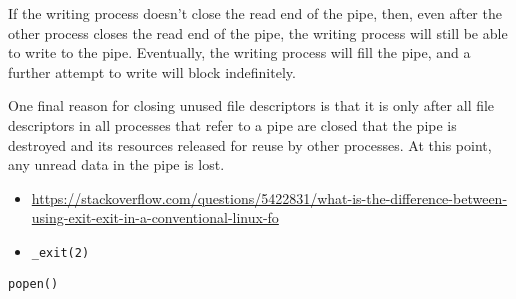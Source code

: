 \begin{itemize}
  If the writing process doesn't close the read end of the pipe, then, even after the
  other process closes the read end of the pipe, the writing process will still be able to
  write to the pipe. Eventually, the writing process will fill the pipe, and a further
  attempt to write will block indefinitely.

  One final reason for closing unused file descriptors is that it is only after all file
  descriptors in all processes that refer to a pipe are closed that the pipe is destroyed
  and its resources released for reuse by other processes. At this point, any unread data
  in the pipe is lost.
\end{itemize}

\begin{frame}
  \begin{center}
  \end{center}
\end{frame}

\begin{itemize}
\item
  \url{https://stackoverflow.com/questions/5422831/what-is-the-difference-between-using-exit-exit-in-a-conventional-linux-fo}
\item \texttt{\_exit(2)}
\end{itemize}

\begin{frame}{\texttt{popen()}}

  
\end{frame}



